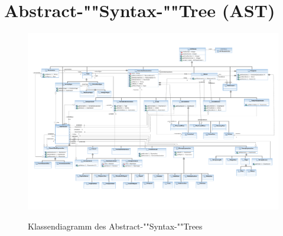 \section{Abstract-""Syntax-""Tree (AST)}

\begin{figure}%

    \caption{Klassendiagramm des Abstract-""Syntax-""Trees}
    \includegraphics[angle=90,height=\textheight]{diagrams/ast_component.pdf}
    \label{ast_diag}
\end{figure}%
